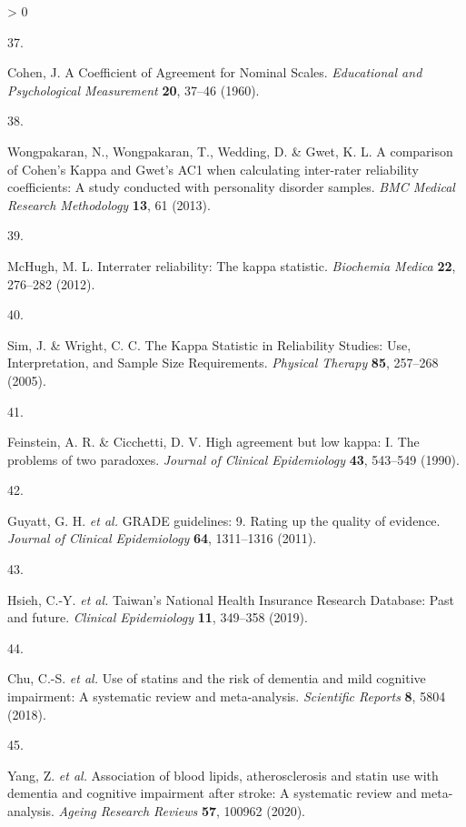 \documentclass[a4paper, twoside]{templates/ociamthesis}
\newlength{\cslhangindent}
\newlength{\csllabelwidth}
\newenvironment{CSLReferences}[3] %
 {%
  \setlength{\parindent}{0pt}
  \ifodd #1 \everypar{\setlength{\hangindent}{\cslhangindent}}\ignorespaces\fi
  \ifnum #2 > 0
  \setlength{\parskip}{#2\baselineskip}
  \fi
 }%
 {}
\newcommand{\CSLLeftMargin}[1]{\parbox[t]{\maxof{\widthof{#1}}{\csllabelwidth}}{#1}}
\newcommand{\CSLRightInline}[1]{\parbox[t]{\linewidth - \csllabelwidth}{#1}}
\begin{document}
\begin{CSLReferences}{0}{0}
\leavevmode\hypertarget{ref-cohen1960}{}%
\CSLLeftMargin{37. }
\CSLRightInline{Cohen, J. A {Coefficient} of {Agreement} for {Nominal Scales}. \emph{Educational and Psychological Measurement} \textbf{20}, 37--46 (1960).}

\leavevmode\hypertarget{ref-wongpakaran2013}{}%
\CSLLeftMargin{38. }
\CSLRightInline{Wongpakaran, N., Wongpakaran, T., Wedding, D. \& Gwet, K. L. A comparison of {Cohen}'s {Kappa} and {Gwet}'s {AC1} when calculating inter-rater reliability coefficients: A study conducted with personality disorder samples. \emph{BMC Medical Research Methodology} \textbf{13}, 61 (2013).}

\leavevmode\hypertarget{ref-mchugh2012}{}%
\CSLLeftMargin{39. }
\CSLRightInline{McHugh, M. L. Interrater reliability: The kappa statistic. \emph{Biochemia Medica} \textbf{22}, 276--282 (2012).}

\leavevmode\hypertarget{ref-sim2005}{}%
\CSLLeftMargin{40. }
\CSLRightInline{Sim, J. \& Wright, C. C. The {Kappa Statistic} in {Reliability Studies}: {Use}, {Interpretation}, and {Sample Size Requirements}. \emph{Physical Therapy} \textbf{85}, 257--268 (2005).}

\leavevmode\hypertarget{ref-feinstein1990}{}%
\CSLLeftMargin{41. }
\CSLRightInline{Feinstein, A. R. \& Cicchetti, D. V. High agreement but low kappa: {I}. {The} problems of two paradoxes. \emph{Journal of Clinical Epidemiology} \textbf{43}, 543--549 (1990).}

\leavevmode\hypertarget{ref-guyatt2011}{}%
\CSLLeftMargin{42. }
\CSLRightInline{Guyatt, G. H. \emph{et al.} {GRADE} guidelines: 9. {Rating} up the quality of evidence. \emph{Journal of Clinical Epidemiology} \textbf{64}, 1311--1316 (2011).}

\leavevmode\hypertarget{ref-hsieh2019}{}%
\CSLLeftMargin{43. }
\CSLRightInline{Hsieh, C.-Y. \emph{et al.} Taiwan's {National Health Insurance Research Database}: Past and future. \emph{Clinical Epidemiology} \textbf{11}, 349--358 (2019).}

\leavevmode\hypertarget{ref-chu2018b}{}%
\CSLLeftMargin{44. }
\CSLRightInline{Chu, C.-S. \emph{et al.} Use of statins and the risk of dementia and mild cognitive impairment: {A} systematic review and meta-analysis. \emph{Scientific Reports} \textbf{8}, 5804 (2018).}

\leavevmode\hypertarget{ref-yang2020}{}%
\CSLLeftMargin{45. }
\CSLRightInline{Yang, Z. \emph{et al.} Association of blood lipids, atherosclerosis and statin use with dementia and cognitive impairment after stroke: {A} systematic review and meta-analysis. \emph{Ageing Research Reviews} \textbf{57}, 100962 (2020).}


\end{CSLReferences}
\end{document}
